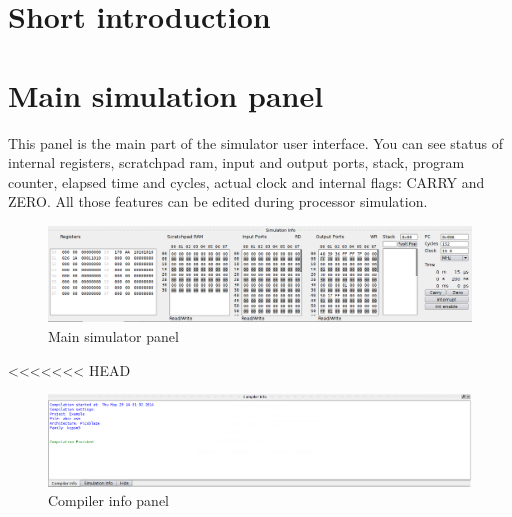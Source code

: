 \section{Short introduction}



\section{Main simulation panel}
This panel is the main part of the simulator user interface.
You can see status of internal registers, scratchpad ram, input and output ports, stack, program counter, elapsed time and cycles, actual clock and internal flags: CARRY and ZERO. All those features can be edited during processor simulation.

   \begin{figure}[h!]
        \centering
        \includegraphics[width=\textwidth]{img/bottom_panel.png}
        \caption{Main simulator panel}
    \end{figure}

<<<<<<< HEAD
   \begin{figure}[h!]
        \centering
        \includegraphics[width=\textwidth]{img/compiler_panel.png}
        \caption{Compiler info panel}
    \end{figure}

